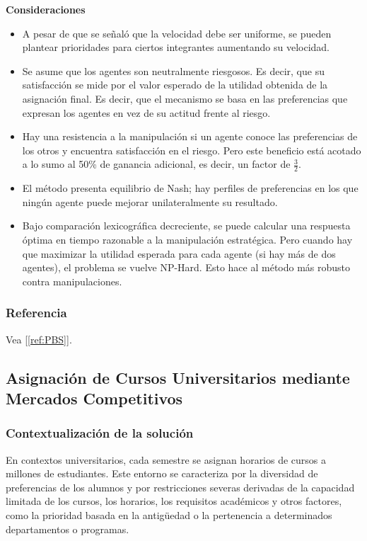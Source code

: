 \documentclass{article}
\begin{document}
\textbf{Consideraciones}

\begin{itemize}
  \item A pesar de que se señaló que la velocidad debe ser uniforme, se pueden plantear prioridades para
        ciertos integrantes aumentando su velocidad.
  \item Se asume que los agentes son neutralmente riesgosos. Es decir, que su satisfacción se mide 
        por el valor esperado de la utilidad obtenida de la asignación final. Es decir, que el mecanismo
        se basa en las preferencias que expresan los agentes en vez de su actitud frente al riesgo.
  \item Hay una resistencia a la manipulación si un agente conoce las preferencias de los otros
        y encuentra satisfacción en el riesgo. Pero este beneficio está acotado a lo sumo al 50\% de
        ganancia adicional, es decir, un factor de $\frac{3}{2}$.
  \item El método presenta equilibrio de Nash; hay perfiles de preferencias en los que ningún agente 
        puede mejorar unilateralmente su resultado.
  \item Bajo comparación lexicográfica decreciente, se puede calcular una respuesta óptima en tiempo 
        razonable a la manipulación estratégica. Pero cuando hay que maximizar la utilidad esperada
        para cada agente (si hay más de dos agentes), el problema se vuelve NP-Hard. Esto hace al 
        método más robusto contra manipulaciones.
\end{itemize}


\subsubsection{Referencia}
Vea [\ref{ref:PBS}].

\subsection{Asignación de Cursos Universitarios mediante Mercados Competitivos}\label{sec:descr}

\subsubsection{Contextualización de la solución}

En contextos universitarios, cada semestre se asignan horarios de cursos a millones de estudiantes. Este entorno se caracteriza por la diversidad de preferencias de los alumnos y por restricciones severas derivadas de la capacidad limitada de los cursos, los horarios, los requisitos académicos y otros factores, como la prioridad basada en la antigüedad o la pertenencia a determinados departamentos o programas.
\end{document}
